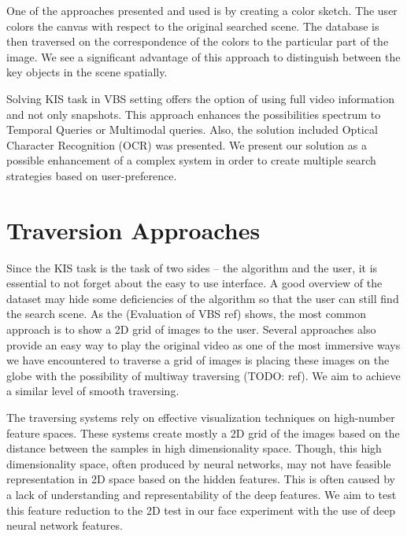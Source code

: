 One of the approaches presented and used is by creating a color sketch. The user colors the canvas with respect to the original searched scene. The database is then traversed on the correspondence of the colors to the particular part of the image. We see a significant advantage of this approach to distinguish between the key objects in the scene spatially.
 
 Solving KIS task in VBS setting offers the option of using full video information and not only snapshots. This approach enhances the possibilities spectrum to Temporal Queries or Multimodal queries. Also, the solution included Optical Character Recognition (OCR) was presented. We present our solution as a possible enhancement of a complex system in order to create multiple search strategies based on user-preference. 



\section*{Traversion Approaches}

Since the KIS task is the task of two sides -- the algorithm and the user, it is essential to not forget about the easy to use interface. A good overview of the dataset may hide some deficiencies of the algorithm so that the user can still find the search scene. As the  (Evaluation of VBS ref) shows, the most common approach is to show a 2D grid of images to the user. Several approaches also provide an easy way to play the original video as one of the most immersive ways we have encountered to traverse a grid of images is placing these images on the globe with the possibility of multiway traversing (TODO: ref). We aim to achieve a similar level of smooth traversing.

The traversing systems rely on effective visualization techniques on high-number feature spaces. These systems create mostly a 2D grid of the images based on the distance between the samples in high dimensionality space. Though, this high dimensionality space, often produced by neural networks, may not have feasible representation in 2D space based on the hidden features. This is often caused by a lack of understanding and representability of the deep features. We aim to test this feature reduction to the 2D test in our face experiment with the use of deep neural network features.